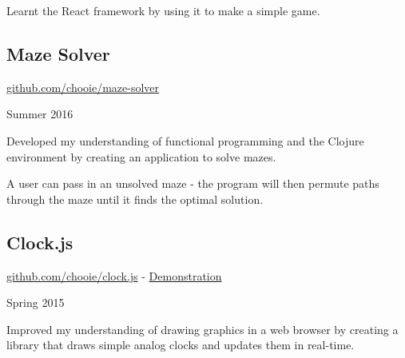 Learnt the React framework by using it to make a simple game.

\subsection*{Maze Solver}
\noindent\begin{minipage}[b]{0.8\textwidth}
  \flushleft
  \href{https://github.com/chooie/maze-solver} {github.com/chooie/maze-solver}
\end{minipage}
\noindent\begin{minipage}[b]{0.2\textwidth}
  \flushright
  Summer 2016
\end{minipage}

Developed my understanding of functional programming and the Clojure environment
by creating an application to solve mazes.

A user can pass in an unsolved maze - the program will then permute paths
through the maze until it finds the optimal solution.

\subsection*{Clock.js}
\noindent\begin{minipage}[b]{0.8\textwidth}
  \flushleft
  \href{https://github.com/chooie/clock.js} {github.com/chooie/clock.js} -
  \href {https://chooie.github.io/clock.js} {Demonstration}
\end{minipage}
\noindent\begin{minipage}[b]{0.2\textwidth}
  \flushright
  Spring 2015
\end{minipage}

Improved my understanding of drawing graphics in a web browser by creating a
library that draws simple analog clocks and updates them in real-time.

